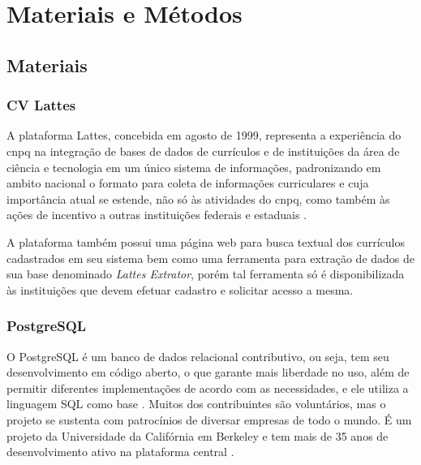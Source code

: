 \chapter{Materiais e Métodos}\label{cap:materialemetodos}

\section{Materiais}\label{sec:materiais}

\subsection{CV Lattes}\label{subsec:lattes}

A plataforma Lattes, concebida em agosto de 1999, representa a experiência do \gls{cnpq} na integração de bases de dados de currículos e de instituições da área de ciência e tecnologia em um único sistema de informações, padronizando em ambito nacional o formato para coleta de informações curriculares e cuja importância atual se estende, não só às atividades do \gls{cnpq}, como também às ações de incentivo a outras instituições federais e estaduais \cite{Lattes}.

A plataforma também possui uma página web para busca textual dos currículos cadastrados em seu sistema bem como uma ferramenta para extração de dados de sua base denominado \textit{Lattes Extrator}, porém tal ferramenta só é disponibilizada às instituições que devem efetuar cadastro e solicitar acesso a mesma.

\subsection{PostgreSQL}\label{subsec:postgresql}

O PostgreSQL é um banco de dados relacional contributivo, ou seja, tem seu desenvolvimento em código aberto, o que garante mais liberdade no uso, além de permitir diferentes implementações de acordo com as necessidades, e ele utiliza a linguagem SQL como base \cite{Amazon}. Muitos dos contribuintes são voluntários, mas o projeto se sustenta com patrocínios de diversar empresas de todo o mundo. É um projeto da Universidade da Califórnia em Berkeley e tem mais de 35 anos de desenvolvimento ativo na plataforma central \cite{PostgreSQL}.

